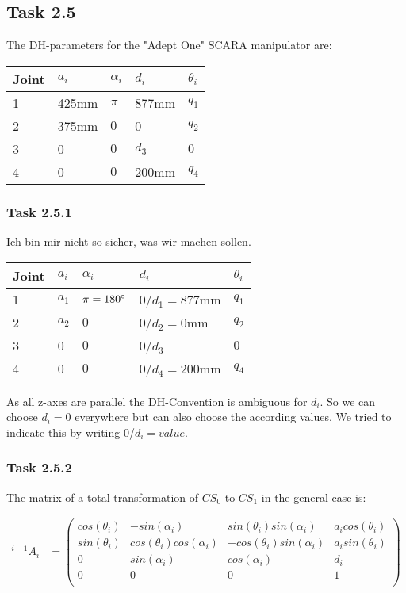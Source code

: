 \subsection*{Task 2.5}
The DH-parameters for the "Adept One" SCARA manipulator are:
\begin{center}
	\begin{tabular}{ | l | l | l | l | l |}
		\hline
		Joint & $a_{i}$ & $\alpha_{i}$ & $d_i$ & $\theta_i$ \\ \hline
		1 & 425mm & $\pi$ & 877mm & $q_1$\\ \hline
		2 & 375mm & $0$ & 0 & $q_2$\\ \hline
		3 & 0 & $0$ & $d_3$ & $0$\\ \hline
		4 & 0 & $0$ & 200mm & $q_4$\\ \hline
	\end{tabular}
\end{center}
\subsubsection*{Task 2.5.1}
Ich bin mir nicht so sicher, was wir machen sollen.
\begin{center}
	\begin{tabular}{ | l | l | l | l | l |}
		\hline
		Joint & $a_{i}$ & $\alpha_{i}$ & $d_i$ & $\theta_i$ \\ \hline
		1 & $a_1$ & $\pi = 180\degree$ & 0/$d_1=877$mm & $q_1$\\ \hline
		2 & $a_2$ & $0$ & 0/$d_2=0$mm & $q_2$\\ \hline
		3 & 0 & $0$ & 0/$d_3$ & $0$\\ \hline
		4 & 0 & $0$ & 0/$d_4=200$mm & $q_4$\\ \hline
	\end{tabular}
\end{center}
As all z-axes are parallel the DH-Convention is ambiguous for $d_i$.
So we can choose $d_i = 0$ everywhere but can also choose the according values. We tried to indicate this by writing 0/$d_i=value$.
\subsubsection*{Task 2.5.2}
The matrix of a total transformation of $CS_0$ to $CS_1$ in the general case is:

\begin{align*}
^{i-1}A_i &= 
\begin{pmatrix}
cos(\theta_i) & -sin(\alpha_i) & sin(\theta_i)sin(\alpha_i) & a_icos(\theta_i) \\
sin(\theta_i) & cos(\theta_i)cos(\alpha_i) & -cos(\theta_i)sin(\alpha_i) & a_isin(\theta_i) \\
0 & sin(\alpha_i) & cos(\alpha_i) & d_i \\
0 & 0 & 0 & 1 \\
\end{pmatrix}
\end{align*}

